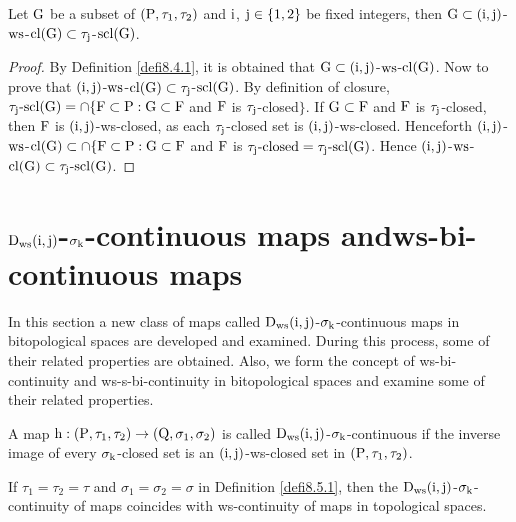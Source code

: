 \begin{thm}\label{thm8.4.4}
Let $\mathrm{G}$ be a subset of $(\mathrm{P}, \tau_1, \tau_2 )$ and $\mathrm{i}$, $\mathrm{j}\in\{1, 2\}$ be fixed integers, then $\mathrm{G} \subset (\mathrm{i}, \mathrm{j})$-$\mathrm{ws}$-$\mathrm{cl}(\mathrm{G}) \subset \tau_{\mathrm{j}}$-$\mathrm{scl}(\mathrm{G})$.
\end{thm}

\begin{proof}
By Definition \ref{defi8.4.1}, it is obtained that $\mathrm{G} \subset (\mathrm{i}, \mathrm{j})$-$\mathrm{ws}$-$\mathrm{cl}(\mathrm{G})$. Now to prove that $(\mathrm{i}, \mathrm{j})$-$\mathrm{ws}$-$\mathrm{cl}(\mathrm{G}) \subset \tau_{\mathrm{j}}$-$\mathrm{scl}(\mathrm{G})$. By definition of closure, $\tau_{\mathrm{j}}\text{-scl}(\mathrm{G})=\cap \{\mathrm{F}\subset\mathrm{P}: \mathrm{G}\subset\mathrm{F}$ and $\mathrm{F}$ is $\tau_{\mathrm{j}}$-closed$\}$. If $\mathrm{G} \subset \mathrm{F}$ and $\mathrm{F}$ is $\tau_{\mathrm{j}}$-closed, then $\mathrm{F}$ is $(\mathrm{i}, \mathrm{j})$-ws-closed, as each $\tau_{\mathrm{j}}$-closed set is $(\mathrm{i}, \mathrm{j})$-ws-closed. Henceforth $(\mathrm{i}, \mathrm{j})$-$\mathrm{ws}$-$\mathrm{cl}(\mathrm{G}) \subset \cap \{\mathrm{F}\subset\mathrm{P}: \mathrm{G}\subset \mathrm{F}$ and $\mathrm{F}$ is $\tau_{\mathrm{j}}\text{-closed}= \tau_{\mathrm{j}}\text{-scl}(\mathrm{G})$. Hence $(\mathrm{i}, \mathrm{j})$-$\mathrm{ws}$-$\mathrm{cl}(\mathrm{G})\subset \tau_{\mathrm{j}}\text{-scl}(\mathrm{G})$.
\end{proof}

\section[$\clrD_{\ws} (\TSi, \TSj)$-$\sigma_{\TSk}$-continuous maps and ws-bi-continuous maps]{\boldmath$\clrD_{\ws} (\TSi, \TSj)$-$\sigma_{\TSk}$-continuous maps and\hfill\break ws-bi-conti\-nuous maps}\label{sec8.5}

In this section a new class of maps called $\clrD_{\ws} (\TSi, \TSj)$-$\sigma_{\TSk}$-continuous maps in bitopological spaces are developed and examined. During this process, some of their related properties are obtained. Also, we form the concept of ws-bi-continuity and ws-s-bi-continuity in bitopological spaces and examine some of their related properties.

\begin{dfn}\label{defi8.5.1}
A map $\mathrm{h}: (\mathrm{P}, \tau_1, \tau_2 )\to (\mathrm{Q}, \sigma_{1}, \sigma_{2} )$ is called $\clrD_{\ws} (\TSi, \TSj)$-$\sigma_{\TSk}$-continuous if the inverse image of every $\sigma_{\TSk}$-closed set is an $(\mathrm{i}, \mathrm{j})$-ws-closed set in $(\mathrm{P}, \tau_1, \tau_2 )$.
\end{dfn}

\begin{rem}\label{rem8.5.1}
If $\tau_1 =\tau_2 =\tau$ and $\sigma_{1} =\sigma_{2} =\sigma$  in Definition \ref{defi8.5.1}, then the $\clrD_{\ws} (\TSi, \TSj)$-$\sigma_{\TSk}$-continuity of maps coincides with ws-continuity of maps in topological spaces.
\end{rem}

